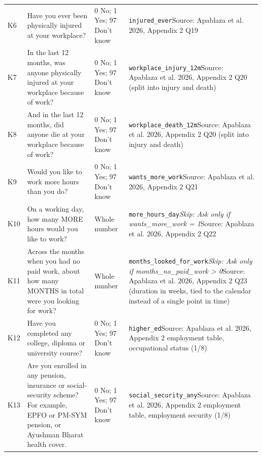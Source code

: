 \documentclass[10pt]{article}
\begin{document}
{\begin{longtable}{p{0.8cm}p{6.4cm}p{3.6cm}p{5.8cm}}
K6 & Have you ever been physically injured at your workplace? & 0 No; 1 Yes; 97 Don't know & \texttt{injured\_ever}\newline Source: Apablaza et al. 2026, Appendix 2 Q19 \\
K7 & In the last 12 months, was anyone physically injured at your workplace because of work? & 0 No; 1 Yes; 97 Don't know & \texttt{workplace\_injury\_12m}\newline Source: Apablaza et al. 2026, Appendix 2 Q20 (split into injury and death) \\
K8 & And in the last 12 months, did anyone die at your workplace because of work? & 0 No; 1 Yes; 97 Don't know & \texttt{workplace\_death\_12m}\newline Source: Apablaza et al. 2026, Appendix 2 Q20 (split into injury and death) \\
K9 & Would you like to work more hours than you do? & 0 No; 1 Yes; 97 Don't know & \texttt{wants\_more\_work}\newline Source: Apablaza et al. 2026, Appendix 2 Q21 \\
K10 & On a working day, how many MORE hours would you like to work? & Whole number & \texttt{more\_hours\_day}\newline \textit{Skip: Ask only if wants\_more\_work = 1}\newline Source: Apablaza et al. 2026, Appendix 2 Q22 \\
K11 & Across the months when you had no paid work, about how many MONTHS in total were you looking for work? & Whole number & \texttt{months\_looked\_for\_work}\newline \textit{Skip: Ask only if months\_no\_paid\_work > 0}\newline Source: Apablaza et al. 2026, Appendix 2 Q23 (duration in weeks, tied to the calendar instead of a single point in time) \\
K12 & Have you completed any college, diploma or university course? & 0 No; 1 Yes; 97 Don't know & \texttt{higher\_ed}\newline Source: Apablaza et al. 2026, Appendix 2 employment table, occupational status (1/8) \\
K13 & Are you enrolled in any pension, insurance or social-security scheme? For example, EPFO or PM-SYM pension, or Ayushman Bharat health cover. & 0 No; 1 Yes; 97 Don't know & \texttt{social\_security\_any}\newline Source: Apablaza et al. 2026, Appendix 2 employment table, employment security (1/8) \\

\end{longtable}}
\end{document}
